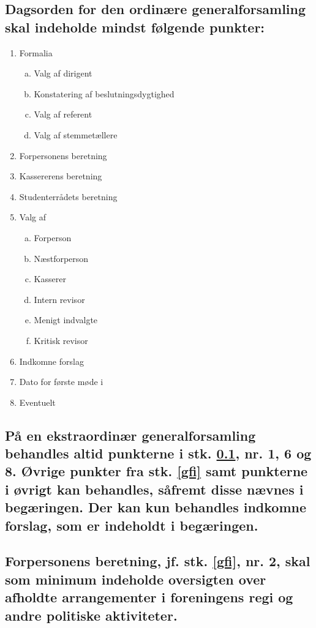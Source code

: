 \documentclass[10pt]{article}
\newcommand{\fagr}{\text{Fagrådet Sigma}}
\begin{document}
\subsection{Dagsorden for den ordinære generalforsamling skal indeholde mindst følgende punkter:}\label{gfi:dagsorden}

\begin{enumerate}[1), nosep]
\item Formalia

	\begin{enumerate}[a., nosep]
	\item Valg af dirigent
	\item Konstatering af beslutningsdygtighed
	\item Valg af referent
	\item Valg af stemmetællere
	\end{enumerate}
\item Forpersonens beretning
\item Kassererens beretning
\item Studenterrådets beretning
\item Valg af
	\begin{enumerate}[a., nosep]
	\item Forperson
	\item Næstforperson
	\item Kasserer
	\item Intern revisor
	\item Menigt indvalgte
	\item Kritisk revisor
	\end{enumerate}
\item Indkomne forslag
\item Dato for første møde i \fagr{}
\item Eventuelt
\end{enumerate}

\subsection{På en ekstraordinær generalforsamling behandles altid punkterne i stk. \ref{gfi:dagsorden}, nr. 1, 6 og 8. Øvrige punkter fra stk. \ref{gfi} samt punkterne i øvrigt kan behandles, såfremt disse nævnes i begæringen. Der kan kun behandles indkomne forslag, som er indeholdt i begæringen.}

\subsection{Forpersonens beretning, jf. stk. \ref{gfi}, nr. 2, skal som minimum indeholde oversigten over afholdte arrangementer i foreningens regi og andre politiske aktiviteter.}
\end{document}
